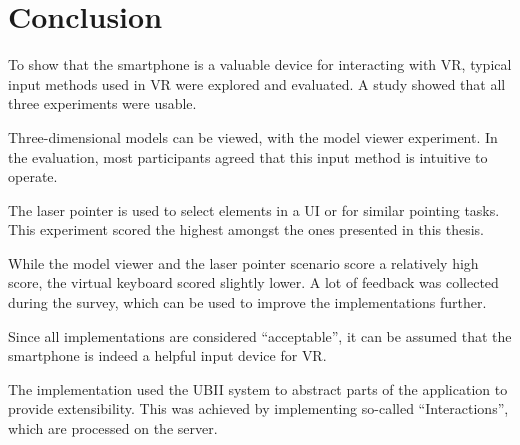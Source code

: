 \chapter{Conclusion}\label{chapter:conclusion}

To show that the smartphone is a valuable device for interacting with \gls{VR}, typical input methods used in \gls{VR} were explored and evaluated. A  study showed that all three experiments were usable. 

Three-dimensional models can be viewed, with the model viewer experiment. In the evaluation, most participants agreed that this input method is intuitive to operate.

The laser pointer is used to select elements in a \gls{UI} or for similar pointing tasks. This experiment scored the highest amongst the ones presented in this thesis. 

While the model viewer and the laser pointer scenario score a relatively high score, the virtual keyboard scored slightly lower. A lot of feedback was collected during the survey, which can be used to improve the implementations further.

Since all implementations are considered \enquote{acceptable}, it can be assumed that the smartphone is indeed a helpful input device for \gls{VR}.

The implementation used the \gls{UBII} system to abstract parts of the application to provide extensibility. This was achieved by implementing so-called \enquote{Interactions}, which are processed on the server. 

